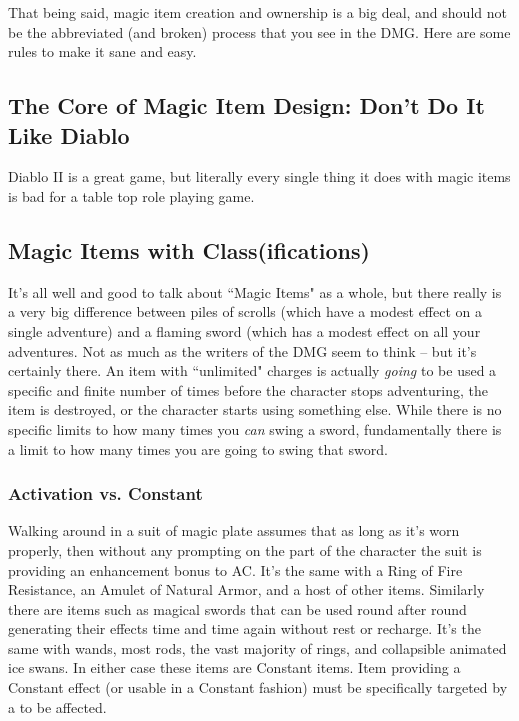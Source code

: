 That being said, magic item creation and ownership is a big deal, and should not be the abbreviated (and broken) process that you see in the DMG. Here are some rules to make it sane and easy.

\subsection{The Core of Magic Item Design: Don't Do It Like Diablo}

Diablo II is a great game, but literally every single thing it does with magic items is bad for a table top role playing game.

\subsection{Magic Items with Class(ifications)}

It's all well and good to talk about ``Magic Items" as a whole, but there really is a very big difference between piles of scrolls (which have a modest effect on a single adventure) and a flaming sword (which has a modest effect on all your adventures. Not as much as the writers of the DMG seem to think -- but it's certainly there. An item with ``unlimited" charges is actually \textit{going} to be used a specific and finite number of times before the character stops adventuring, the item is destroyed, or the character starts using something else. While there is no specific limits to how many times you \textit{can} swing a sword, fundamentally there is a limit to how many times you are going to swing that sword.

\subsubsection{Activation vs. Constant}

Walking around in a suit of magic plate assumes that as long as it's worn properly, then without any prompting on the part of the character the suit is providing an enhancement bonus to AC. It's the same with a Ring of Fire Resistance, an Amulet of Natural Armor, and a host of other items. Similarly there are items such as magical swords that can be used round after round generating their effects time and time again without rest or recharge. It's the same with wands, most rods, the vast majority of rings, and collapsible animated ice swans. In either case these items are Constant items. Item providing a Constant effect (or usable in a Constant fashion) must be specifically targeted by a  to be affected.

